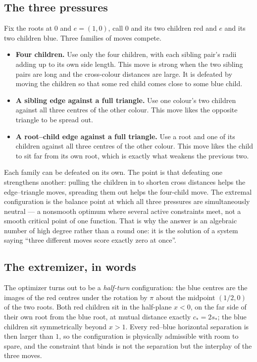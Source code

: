 \documentclass[11pt]{article}
\theoremstyle{plain}
\theoremstyle{definition}
\theoremstyle{remark}
\newcommand{\sstar}{s_{\!*}}
\newcommand{\cstar}{c_{\!*}}
\begin{document}
\subsection{The three pressures}

Fix the roots at $0$ and $e=(1,0)$, call $0$ and its two children red and
$e$ and its two children blue.  Three families of moves compete.

\begin{itemize}
\item \textbf{Four children.}  Use only the four children, with each
      sibling pair's radii adding up to its own side length.  This move is
      strong when the two sibling pairs are long and the cross-colour
      distances are large.  It is defeated by moving the children so that
      some red child comes close to some blue child.
\item \textbf{A sibling edge against a full triangle.}  Use one colour's
      two children against all three centres of the other colour.  This
      move likes the opposite triangle to be spread out.
\item \textbf{A root--child edge against a full triangle.}  Use a root and
      one of its children against all three centres of the other colour.
      This move likes the child to sit far from its own root, which is
      exactly what weakens the previous two.
\end{itemize}

Each family can be defeated on its own.  The point is that defeating one
strengthens another: pulling the children in to shorten cross distances
helps the edge--triangle moves, spreading them out helps the four-child
move.  The extremal configuration is the balance point at which all three
pressures are simultaneously neutral --- a nonsmooth optimum where several
active constraints meet, not a smooth critical point of one function.  That
is why the answer is an algebraic number of high degree rather than a
round one: it is the solution of a system saying ``three different moves
score exactly zero at once''.

\subsection{The extremizer, in words}

The optimizer turns out to be a \emph{half-turn} configuration: the blue
centres are the images of the red centres under the rotation by $\pi$ about
the midpoint $(1/2,0)$ of the two roots.  Both red children sit in the
half-plane $x<0$, on the far side of their own root from the blue root, at
mutual distance exactly $\cstar=2\sstar$; the blue children sit
symmetrically beyond $x>1$.  Every red--blue horizontal separation is then
larger than $1$, so the configuration is physically admissible with room to
spare, and the constraint that binds is not the separation but the
interplay of the three moves.
\end{document}
